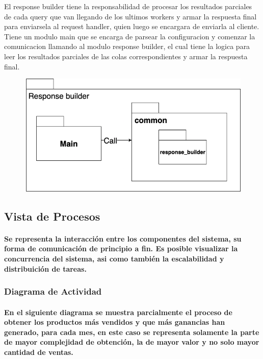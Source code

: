 \documentclass[titlepage,a4paper]{article}
\begin{document}
El response builder tiene la responsabilidad de procesar los resultados parciales de cada query que van llegando de los ultimos workers y armar la respuesta final para enviarsela al request handler, quien luego se encargara de enviarla al cliente. Tiene un modulo main que se encarga de parsear la configuracion y comenzar la comunicacion llamando al modulo response builder, el cual tiene la logica para leer los resultados parciales de las colas correspondientes y armar la respuesta final.
\begin{figure}[H]
    \centering
    \includegraphics[width=0.8\linewidth]{paquete-rb.png}
\end{figure}

\subsection{Vista de Procesos}

\paragraph{Se representa la interacción entre los componentes del sistema, su forma de comunicación de principio a fin. Es posible visualizar la concurrencia del sistema, asi como también la escalabilidad y distribuición de tareas.}

\subsubsection{Diagrama de Actividad}
\paragraph{En el siguiente diagrama se muestra parcialmente el proceso de obtener los productos más vendidos y que más ganancias han generado, para cada mes, en este caso se representa solamente la parte de mayor complejidad de obtención, la de mayor valor y no solo mayor cantidad de ventas.}
\end{document}
